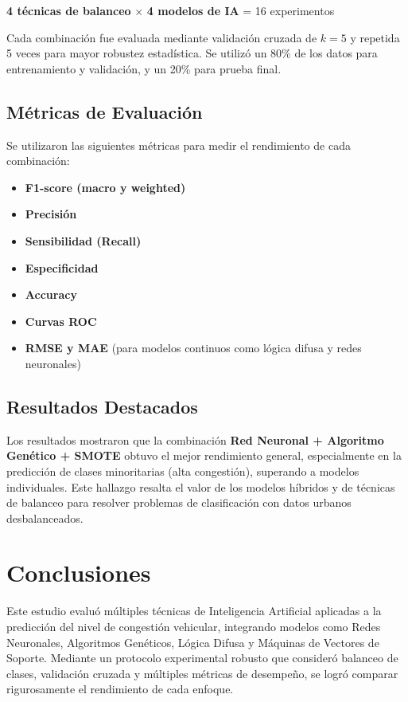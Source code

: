 \documentclass{svproc} %
\begin{document}
\begin{center}
\textbf{4 técnicas de balanceo} × \textbf{4 modelos de IA} = 16 experimentos
\end{center}

Cada combinación fue evaluada mediante validación cruzada de \( k = 5 \) y repetida 5 veces para mayor robustez estadística. Se utilizó un 80\% de los datos para entrenamiento y validación, y un 20\% para prueba final.

\subsection{Métricas de Evaluación}

Se utilizaron las siguientes métricas para medir el rendimiento de cada combinación:

\begin{itemize}
    \item \textbf{F1-score (macro y weighted)}
    \item \textbf{Precisión}
    \item \textbf{Sensibilidad (Recall)}
    \item \textbf{Especificidad}
    \item \textbf{Accuracy}
    \item \textbf{Curvas ROC}
    \item \textbf{RMSE y MAE} (para modelos continuos como lógica difusa y redes neuronales)
\end{itemize}

\subsection{Resultados Destacados}

Los resultados mostraron que la combinación \textbf{Red Neuronal + Algoritmo Genético + SMOTE} obtuvo el mejor rendimiento general, especialmente en la predicción de clases minoritarias (alta congestión), superando a modelos individuales. Este hallazgo resalta el valor de los modelos híbridos y de técnicas de balanceo para resolver problemas de clasificación con datos urbanos desbalanceados.

\section{Conclusiones}

Este estudio evaluó múltiples técnicas de Inteligencia Artificial aplicadas a la predicción del nivel de congestión vehicular, integrando modelos como Redes Neuronales, Algoritmos Genéticos, Lógica Difusa y Máquinas de Vectores de Soporte. Mediante un protocolo experimental robusto que consideró balanceo de clases, validación cruzada y múltiples métricas de desempeño, se logró comparar rigurosamente el rendimiento de cada enfoque.
\end{document}

